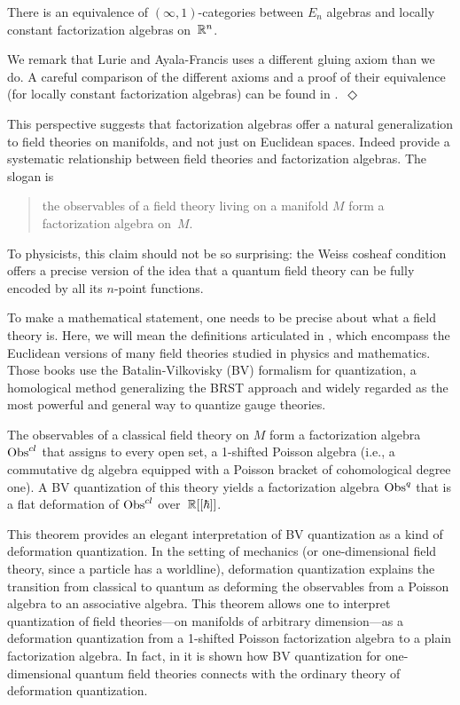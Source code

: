 \documentclass[11pt]{amsart}
\begin{document}
\begin{thm}\label{thm:locisen}
There is an equivalence of $(\infty,1)$-categories between $E_n$ algebras and locally constant factorization algebras on~$\mathbb R^n$.  
\end{thm}  

\begin{rmk}
We remark that Lurie and Ayala-Francis uses a different gluing axiom than we do. A careful comparison of the different axioms and a proof of their equivalence (for locally constant factorization algebras) can be found in \cite{Matsuoka}.~\hfill $\Diamond$
\end{rmk}

This perspective suggests that factorization algebras offer a natural generalization to field theories on manifolds, and not just on Euclidean spaces. Indeed \cite{CG1, CG2} provide a systematic relationship between field theories and factorization algebras.
The slogan is 
\begin{quote}
the observables of a field theory living on a manifold $M$ form a factorization algebra on~$M$. 
\end{quote}
To physicists, this claim should not be so surprising:
the Weiss cosheaf condition offers a precise version of the idea that a quantum field theory can be fully encoded by all its $n$-point functions.

To make a mathematical statement, one needs to be precise about what a field theory is.
Here, we will mean the definitions articulated in \cite{CosBook,CG1, CG2}, which encompass the Euclidean versions of many field theories studied in physics and mathematics.
Those books use the Batalin-Vilkovisky (BV) formalism for quantization, a homological method generalizing the BRST approach and widely regarded as the most powerful and general way to quantize gauge theories. 

\begin{thm}
\label{main}
The observables of a classical field theory on $M$ form a factorization algebra ${\rm Obs}^{cl}$ that assigns to every open set, a 1-shifted Poisson algebra (i.e., a commutative dg algebra equipped with a Poisson bracket of cohomological degree one). A BV quantization of this theory yields a factorization algebra ${\rm Obs}^q$ that is a flat deformation of ${\rm Obs}^{cl}$ over~$\mathbb R[[\hbar]]$.
\end{thm}

This theorem provides an elegant interpretation of BV quantization as a kind of deformation quantization. 
In the setting of mechanics (or one-dimensional field theory, since a particle has a worldline), deformation quantization explains the transition from classical to quantum as deforming the observables from a Poisson algebra to an associative algebra. 
This theorem allows one to interpret quantization of field theories---on manifolds of arbitrary dimension---as a deformation quantization from a 1-shifted Poisson factorization algebra to a plain factorization algebra. 
In fact, in \cite{GLL,Si Kai and Zhengping} it is shown how BV quantization for one-dimensional quantum field theories connects with the ordinary theory of deformation quantization. 
\end{document}
